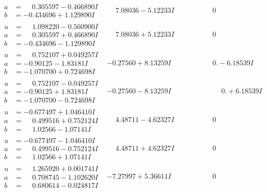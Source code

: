 \documentclass[1p]{elsarticle_modified}
\theoremstyle{definition}
\begin{document}
$$\begin{array}{c|c|c}
\begin{aligned}
a &= \phantom{-}0.305597 - 0.466890 I \\
b &= -0.434696 + 1.129890 I\end{aligned}
 & \phantom{-}7.08036 - 5.12233 I & \phantom{-0.000000 } 0 \\ \hline\begin{aligned}
u &= \phantom{-}1.098220 - 0.560900 I \\
a &= \phantom{-}0.305597 + 0.466890 I \\
b &= -0.434696 - 1.129890 I\end{aligned}
 & \phantom{-}7.08036 + 5.12233 I & \phantom{-0.000000 } 0 \\ \hline\begin{aligned}
u &= \phantom{-}0.752107 + 0.049257 I \\
a &= -0.90125 - 1.83181 I \\
b &= -1.070700 + 0.724698 I\end{aligned}
 & -0.27560 + 8.13259 I & \phantom{-0.000000 } 0. - 6.18539 I \\ \hline\begin{aligned}
u &= \phantom{-}0.752107 - 0.049257 I \\
a &= -0.90125 + 1.83181 I \\
b &= -1.070700 - 0.724698 I\end{aligned}
 & -0.27560 - 8.13259 I & \phantom{-0.000000 -}0. + 6.18539 I \\ \hline\begin{aligned}
u &= -0.677497 + 1.046410 I \\
a &= \phantom{-}0.499516 + 0.752124 I \\
b &= \phantom{-}1.02566 - 1.07141 I\end{aligned}
 & \phantom{-}4.48711 - 4.62327 I & \phantom{-0.000000 } 0 \\ \hline\begin{aligned}
u &= -0.677497 - 1.046410 I \\
a &= \phantom{-}0.499516 - 0.752124 I \\
b &= \phantom{-}1.02566 + 1.07141 I\end{aligned}
 & \phantom{-}4.48711 + 4.62327 I & \phantom{-0.000000 } 0 \\ \hline\begin{aligned}
u &= \phantom{-}1.265920 + 0.001741 I \\
a &= \phantom{-}0.708745 - 1.102620 I \\
b &= \phantom{-}0.680614 - 0.024817 I\end{aligned}
 & -7.27997 + 5.36611 I & \phantom{-0.000000 } 0 \\ \hline\begin{aligned}

\end{aligned}
\end{array}$$
\end{document}
